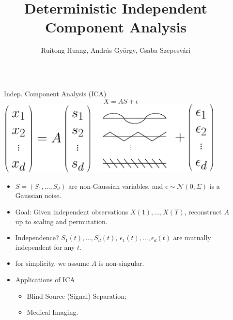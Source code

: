 \documentclass[final]{beamer} %
\title{Deterministic Independent Component Analysis }
\author{Ruitong Huang, Andr\'as Gy\"orgy, Csaba Szepesv\'{a}ri}
\newcommand{\eps}{\epsilon}
\begin{document}
\begin{frame}[c]
	\vspace{-1.5cm}

	\begin{columns}[t,totalwidth=\textwidth]
	
	\begin{column}{0.01\textwidth}
	\end{column}

 	\begin{column}{.24\textwidth}%
		\begin{block}{Indep. Component Analysis (ICA)}
		\vspace{-1.5cm}
			\begin{equation*}
			\label{eq:stoch-ICA}
			X = AS+\epsilon
			\end{equation*}
			\vspace{1cm}
			\includegraphics[width=0.9\textwidth]{ICA_model.eps}
			\begin{itemize}
				\item $S = (S_1,\ldots, S_d)$ are non-Gaussian variables, and	$\eps \sim \mathcal{N}(0,\Sigma)$ is a Gaussian noise. 
				\item Goal: Given independent observations $X(1), \ldots, X(T)$, reconstruct $A$ up to scaling and permutation.
				\item Independence? $S_1(t),\ldots, S_d(t)$, $\eps_1(t), \ldots, \eps_d(t)$ are mutually independent for any $t$.
				\item for simplicity, we assume $A$ is non-singular. 
				\item Applications of ICA	
				\begin{itemize}
						\item Blind Source (Signal) Separation;
						\item Medical Imaging.
				\end{itemize}				
			\end{itemize}						
		\end{block}
		\vspace{1.0ex}
	

\end{column}
\end{columns}
\end{frame}
\end{document}
